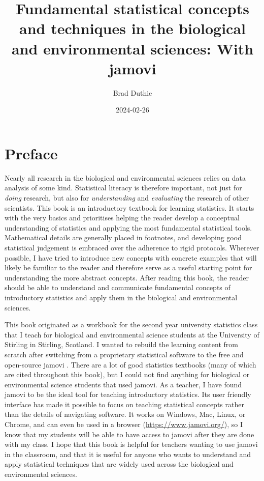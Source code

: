 \documentclass[
  openany]{scrbook}
\title{Fundamental statistical concepts and techniques in the biological and environmental sciences: With jamovi}
\author{Brad Duthie}
\date{2024-02-26}
\begin{document}
\maketitle

{
\hypersetup{linkcolor=}
\setcounter{tocdepth}{1}
\tableofcontents
}
\hypertarget{preface}{%
\chapter*{Preface}\label{preface}}

Nearly all research in the biological and environmental sciences relies on data analysis of some kind.
Statistical literacy is therefore important, not just for \emph{doing} research, but also for \emph{understanding} and \emph{evaluating} the research of other scientists.
This book is an introductory textbook for learning statistics.
It starts with the very basics and prioritises helping the reader develop a conceptual understanding of statistics and applying the most fundamental statistical tools.
Mathematical details are generally placed in footnotes, and developing good statistical judgement is embraced over the adherence to rigid protocols.
Wherever possible, I have tried to introduce new concepts with concrete examples that will likely be familiar to the reader and therefore serve as a useful starting point for understanding the more abstract concepts.
After reading this book, the reader should be able to understand and communicate fundamental concepts of introductory statistics and apply them in the biological and environmental sciences.

This book originated as a workbook for the second year university statistics class that I teach for biological and environmental science students at the University of Stirling in Stirling, Scotland.
I wanted to rebuild the learning content from scratch after switching from a proprietary statistical software to the free and open-source jamovi \citep{Jamovi2022}.
There are a lot of good statistics textbooks (many of which are cited throughout this book), but I could not find anything for biological or environmental science students that used jamovi.
As a teacher, I have found jamovi to be the ideal tool for teaching introductory statistics.
Its user friendly interface has made it possible to focus on teaching statistical concepts rather than the details of navigating software.
It works on Windows, Mac, Linux, or Chrome, and can even be used in a browser (\url{https://www.jamovi.org/}), so I know that my students will be able to have access to jamovi after they are done with my class.
I hope that this book is helpful for teachers wanting to use jamovi in the classroom, and that it is useful for anyone who wants to understand and apply statistical techniques that are widely used across the biological and environmental sciences.
\end{document}
